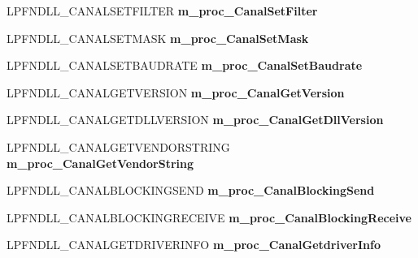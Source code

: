 \begin{DoxyCompactItemize}
\item 
\hypertarget{class_c_dll_wrapper_a37351efe4a1e546a2eda41cc477478c7}{
LPFNDLL\_\-CANALSETFILTER {\bfseries m\_\-proc\_\-CanalSetFilter}}
\label{de/d52/class_c_dll_wrapper_a37351efe4a1e546a2eda41cc477478c7}

\item 
\hypertarget{class_c_dll_wrapper_a6ce406d144a2d929e56f6917cee8de1d}{
LPFNDLL\_\-CANALSETMASK {\bfseries m\_\-proc\_\-CanalSetMask}}
\label{de/d52/class_c_dll_wrapper_a6ce406d144a2d929e56f6917cee8de1d}

\item 
\hypertarget{class_c_dll_wrapper_acc86a1be3981ab413326ad3afa159ecf}{
LPFNDLL\_\-CANALSETBAUDRATE {\bfseries m\_\-proc\_\-CanalSetBaudrate}}
\label{de/d52/class_c_dll_wrapper_acc86a1be3981ab413326ad3afa159ecf}

\item 
\hypertarget{class_c_dll_wrapper_ac3fd58c15cd91c286968c7a6fa5ee670}{
LPFNDLL\_\-CANALGETVERSION {\bfseries m\_\-proc\_\-CanalGetVersion}}
\label{de/d52/class_c_dll_wrapper_ac3fd58c15cd91c286968c7a6fa5ee670}

\item 
\hypertarget{class_c_dll_wrapper_af69ad4b54d18f9d90e9fb2d1c5efdf4b}{
LPFNDLL\_\-CANALGETDLLVERSION {\bfseries m\_\-proc\_\-CanalGetDllVersion}}
\label{de/d52/class_c_dll_wrapper_af69ad4b54d18f9d90e9fb2d1c5efdf4b}

\item 
\hypertarget{class_c_dll_wrapper_aca87ccf948accba2ea5cced7c9b50561}{
LPFNDLL\_\-CANALGETVENDORSTRING {\bfseries m\_\-proc\_\-CanalGetVendorString}}
\label{de/d52/class_c_dll_wrapper_aca87ccf948accba2ea5cced7c9b50561}

\item 
\hypertarget{class_c_dll_wrapper_a8a0dd4377ae830a9f98c88dfeec7ebf5}{
LPFNDLL\_\-CANALBLOCKINGSEND {\bfseries m\_\-proc\_\-CanalBlockingSend}}
\label{de/d52/class_c_dll_wrapper_a8a0dd4377ae830a9f98c88dfeec7ebf5}

\item 
\hypertarget{class_c_dll_wrapper_a6eb7c36a4c00ef71f2fe5a044825cb6e}{
LPFNDLL\_\-CANALBLOCKINGRECEIVE {\bfseries m\_\-proc\_\-CanalBlockingReceive}}
\label{de/d52/class_c_dll_wrapper_a6eb7c36a4c00ef71f2fe5a044825cb6e}

\item 
\hypertarget{class_c_dll_wrapper_ab42e9615db545bd1283fb07fc19ca0e0}{
LPFNDLL\_\-CANALGETDRIVERINFO {\bfseries m\_\-proc\_\-CanalGetdriverInfo}}
\label{de/d52/class_c_dll_wrapper_ab42e9615db545bd1283fb07fc19ca0e0}

\end{DoxyCompactItemize}




